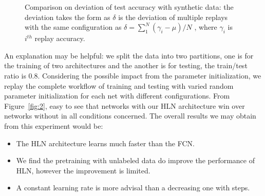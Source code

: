 \documentclass[3p,times,procedia]{elsarticle}
\begin{document}
\begin{figure}[h]
	\centering
	\hspace{-8mm}
	\hspace{-8mm}
	\caption{
		Comparison on deviation of test
		accuracy with synthetic data:
		the deviation takes the form as
		$\delta$ is the deviation of
		multiple replays with the same
		configuration as 
		$\delta=\sum_1^N(\gamma_i-\mu)/N$
		, where $\gamma_i$ is $i^{th}$ 
		replay accuracy.
		}
	\label{fig:3}
\end{figure}

An explanation may be helpful:
we split the data into two partitions, 
one is for the training of two
architectures and the another is for
testing, the train/test ratio is 0.8.
Considering the possible impact from
the parameter initialization, 
we replay the complete workflow
of training and testing with varied
random parameter initialization
for each net with different 
configurations.
From Figure~\ref{fig:2}, easy
to see that networks with our HLN 
architecture win over networks without 
in all conditions concerned.
The overall results we may obtain
from this experiment would be:
\begin{itemize}
	\item The HLN architecture 
		learns much faster than the 
		FCN.
	\item We find the pretraining
		with unlabeled data do improve 
		the performance of HLN, however 
		the improvement is limited.
	\item A constant learning rate is
		more advisal than a decreasing 
		one with steps.
\end{itemize}
\end{document}

